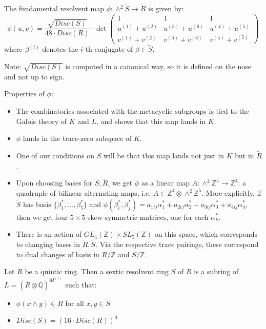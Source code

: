 \documentclass{report}
\begin{document}
\begin{definition}
The fundamental resolvent map $ \phi : \wedge^2 \tilde{S} \to \tilde{R}$ is given by:
\begin{equation}
\phi (u,v) = \frac{\sqrt{Disc(S)}}{48 \cdot Disc(R)} \cdot \det
\begin{pmatrix}
1 & 1 & 1 \\
u^{(1)} + u^{(2)} & u^{(3)} + u^{(6)} & u^{(4)} + u^{(5)} \\
v^{(1)} + v^{(2)} & v^{(3)} + v^{(6)} & v^{(4)} + v^{(5)}
\end{pmatrix}
\end{equation}
where $\beta^{(i)}$ denotes the $i$-th conjugate of $\beta \in \tilde{S}$.
\end{definition}

Note: $\sqrt{Disc(S)}$ is computed in a canonical way, so it is defined on the nose and not up to sign.

Properties of $ \phi $:
\begin{itemize}
\item The combinatorics associated with the metacyclic subgroups is tied to the Galois theory of $K$ and $L$, and shows that this map lands in $K$.
\item $\phi$ lands in the trace-zero subspace of $K$.
\item One of our conditions on $S$ will be that this map lands not just in $K$ but in $\tilde{R}$.
\item Upon choosing bases for $\tilde{S}, \tilde{R}$, we get $\phi$ as a linear map $A : \wedge^2 \mathbb{Z}^5 \to \mathbb{Z}^4$: a quadruple of bilinear alternating maps, i.e. $A \in \mathbb{Z}^4 \otimes \wedge^2 \mathbb{Z}^5$.  More explicitly, if $\tilde{S}$ has basis $\{\beta_1^*, \ldots, \beta_5^*\}$ and $\phi(\beta_i^*,\beta_j^*) = a_{1ij} \alpha_1^* + a_{2ij} \alpha_2^* + a_{3ij} \alpha_3^* + a_{4ij} \alpha_4^*$, then we get four $5 \times 5$ skew-symmetric matrices, one for each $\alpha_k^*$.
\item There is an action of $GL_4(\mathbb{Z}) \times SL_5(\mathbb{Z})$ on this space, which corresponds to changing bases in $\tilde{R}, \tilde{S}$.  Via the respective trace pairings, these correspond to dual changes of basis in $R / \mathbb{Z}$ and $S / \mathbb{Z}$.
\end{itemize}

\begin{definition}
Let $R$ be a quintic ring.  Then a sextic resolvent ring $S$ of $R$ is a subring of $L = (\bar{R} \otimes \mathbb{Q})^{M^{(1)}}$ such that:
\begin{itemize}
\item $\phi(x \wedge y) \in \tilde{R}$ for all $x,y \in \tilde{S}$
\item $Disc(S) = (16 \cdot Disc(R))^3$
\end{itemize}
\end{definition}
\end{document}
